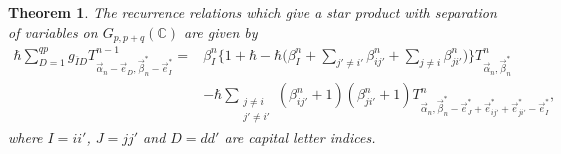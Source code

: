 \documentclass[pdftex]{sigma}
\numberwithin{equation}{section}
\newtheorem{Theorem}{Theorem}[section]
\begin{document}
\begin{Theorem}\label{theorem_rec_rel_Grassmann_general}
The recurrence relations which give a star product with separation of variables on
$ G_{p,p+q}(\mathbb{C})$
are given by
\begin{align}
 \hbar
 \sum_{D=1}^{qp}
 g_{\overline{I}D}
 T^{n-1}_{\vec{\alpha}_{n}-\vec{e}_{D},\vec{\beta}_{n}^{\ast}-\vec{e}_{I}^{\ast}}
 ={}&
 \beta_{I}^{n}
 \bigg\{
 1
 +
 \hbar
 -
 \hbar
 \bigg(
 \beta_{I}^{n}
 +
 \sum_{j'\neq i'}
 \beta_{ij'}^{n}
 +
 \sum_{j\neq i}
 \beta_{ji'}^{n}
 \bigg)
 \bigg\}
 T^{n}_{\vec{\alpha}_{n},\vec{\beta}_{n}^{\ast}}\nonumber \\
 &
 -
 \hbar
 \sum_{
 \substack{
 j\neq i
 \\
 j'\neq i'}
 }
 (
 \beta_{ij'}^{n}
 +
 1
 )
 (
 \beta_{ji'}^{n}
 +
 1
 )
 T^{n}_{\vec{\alpha}_{n},\vec{\beta}_{n}^{\ast}-\vec{e}_{J}^{\ast}+\vec{e}_{ij'}^{\ast}+\vec{e}_{ji'}^{\ast}-\vec{e}_{I}^{\ast}}
 ,
\label{rec_rel_Grassmann_general}
\end{align}
where $I=ii'$, $J=jj'$ and $D=dd'$ are capital letter indices.
\end{Theorem}
\end{document}
